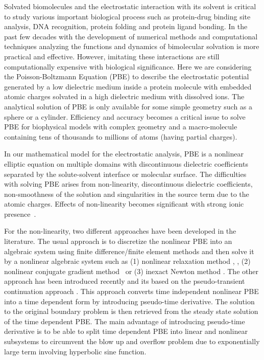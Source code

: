 Solvated biomolecules and the electrostatic interaction with its solvent is critical to study various important biological process such as protein-drug binding site analysis, DNA recognition, protein folding and protein ligand bonding. In the past few decades with the development of numerical methods and computational techniques analyzing the functions and dynamics of bimolecular solvation is more practical and effective. However, imitating these interactions are still computationally expensive with biological significance. Here we are considering the Poisson-Boltzmann Equation (PBE)  to describe the electrostatic potential generated by a low dielectric medium inside a protein molecule with embedded atomic charges solvated in a high dielectric medium with dissolved ions. The analytical solution of PBE is only available for some simple geometry such as a sphere or a cylinder. Efficiency and accuracy becomes a critical issue to solve PBE for biophysical models with complex geometry and a macro-molecule containing tens of thousands to millions of atoms (having partial charges). 

 In our mathematical model for the electrostatic analysis, PBE is a nonlinear elliptic equation on multiple domains with discontinuous dielectric coefficients separated  by the solute-solvent interface or molecular surface. The difficulties with solving PBE arises from non-linearity, discontinuous dielectric coefficients, non-smoothness of the solution and singularities in the source term due to the atomic charges. Effects of non-linearity becomes significant with strong ionic presence~\cite{Wilson2016}. 


For the non-linearity, two different approaches have been developed in the literature. The usual approach is to discretize the nonlinear PBE into an algebraic system using finite difference/finite element methods and then solve it by a nonlinear algebraic system such as (1) nonlinear relaxation method \cite{Im1998}, \cite{Rocchia2001}, (2) nonlinear conjugate gradient method~\cite{Luty1992} or (3) inexact Newton method \cite{Holst1995}. The other approach has been introduced recently and its based on the  pseudo-transient continuation approach \cite{Shestakov2002,Sayyed-Ahmad2004,Zhao2011}. This approach converts time independent nonlinear PBE into a time dependent form by introducing pseudo-time derivative. The solution to the original boundary problem is then retrieved from the steady state solution of the time dependent PBE. The main advantage of introducing pseudo-time derivative is to be able to split time dependent PBE into linear and nonlinear subsystems to circumvent the blow up and overflow problem due to exponentially large term involving hyperbolic sine function. 

